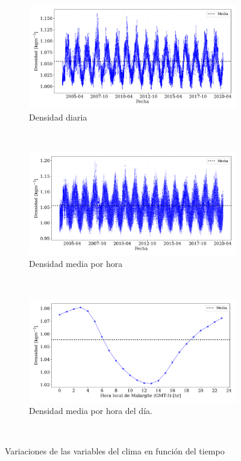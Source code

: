 \begin{figure}[H]
	\centering
        \begin{subfigure}[b]{0.8\textwidth}	
			\includegraphics[width=\textwidth]{Graphs/clima/densidad_diaria_v2.png}
			\caption{Densidad diaria}
			\label{fig:densidad_diaria}
        \end{subfigure}\\
        \begin{subfigure}[b]{0.8\textwidth}
			\includegraphics[width=\textwidth]{Graphs/clima/densidad_media_diaria_v2.png}
			\caption{Densidad media por hora}
			\label{fig:densidad_hora}
		\end{subfigure}\\
        \begin{subfigure}[b]{0.8\textwidth}	
			\includegraphics[width=\textwidth]{Graphs/clima/densidad_hod_v2.png}
			\caption{Densidad media por hora del día.}
			\label{fig:area_auger}
        \end{subfigure}\\
  \caption{Variaciones de las variables del clima en función del tiempo}
  \label{fig:clima_p_rho}
\end{figure}

